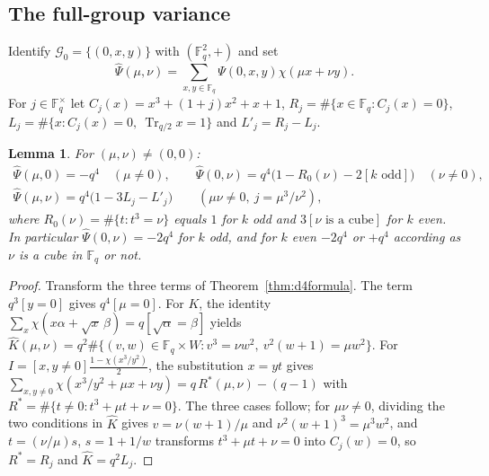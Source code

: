 \documentclass[11pt,a4paper]{amsart}
\newtheorem{lemma}[theorem]{Lemma}
\theoremstyle{definition}
\newcommand{\F}{\mathbb{F}}
\newcommand{\G}{\mathcal{G}}
\newcommand{\Tr}{\operatorname{Tr}}
\begin{document}
\subsection{The full-group variance}
Identify $\G_0=\{(0,x,y)\}$ with $(\F_q^2,+)$ and set
\begin{equation}\label{eq:fourier0}
\widehat\Psi(\mu,\nu)=\sum_{x,y\in\F_q}\Psi(0,x,y)\chi(\mu x+\nu y).
\end{equation}
For $j\in\F_q^\times$ let $C_j(x)=x^3+(1+j)x^2+x+1$, $R_j=\#\{x\in\F_q:C_j(x)=0\}$, $L_j=\#\{x:C_j(x)=0,\ \Tr_{q/2}x=1\}$ and $L'_j=R_j-L_j$.

\begin{lemma}\label{lem:fourier4}
For $(\mu,\nu)\ne(0,0)$:
\begin{gather*}
\widehat\Psi(\mu,0)=-q^4\quad(\mu\ne0),\qquad
\widehat\Psi(0,\nu)=q^4\bigl(1-R_0(\nu)-2[k\text{ odd}]\bigr)\quad(\nu\ne0),\\
\widehat\Psi(\mu,\nu)=q^4\bigl(1-3L_j-L'_j\bigr)\qquad(\mu\nu\ne0,\ j=\mu^3/\nu^2),
\end{gather*}
where $R_0(\nu)=\#\{t:t^3=\nu\}$ equals $1$ for $k$ odd and $3[\nu\text{ is a cube}]$ for $k$ even. In particular $\widehat\Psi(0,\nu)=-2q^4$ for $k$ odd, and for $k$ even $-2q^4$ or $+q^4$ according as $\nu$ is a cube in $\F_q$ or not.
\end{lemma}
\begin{proof}
Transform the three terms of Theorem~\ref{thm:d4formula}. The term $q^3[y=0]$ gives $q^4[\mu=0]$. For $K$, the identity $\sum_{x}\chi(x\alpha+\sqrt x\,\beta)=q[\sqrt\alpha=\beta]$ yields
$\widehat K(\mu,\nu)=q^2\#\{(v,w)\in\F_q\times W:v^3=\nu w^2,\ v^2(w+1)=\mu w^2\}$. For $I=[x,y\ne0]\frac{1-\chi(x^3/y^2)}2$, the substitution $x=yt$ gives $\sum_{x,y\ne0}\chi(x^3/y^2+\mu x+\nu y)=q\,R^*(\mu,\nu)-(q-1)$ with $R^*=\#\{t\ne0:t^3+\mu t+\nu=0\}$. The three cases follow; for $\mu\nu\ne0$, dividing the two conditions in $\widehat K$ gives $v=\nu(w+1)/\mu$ and $\nu^2(w+1)^3=\mu^3w^2$, and $t=(\nu/\mu)s$, $s=1+1/w$ transforms $t^3+\mu t+\nu=0$ into $C_j(w)=0$, so $R^*=R_j$ and $\widehat K=q^2L_j$.
\end{proof}
\end{document}

